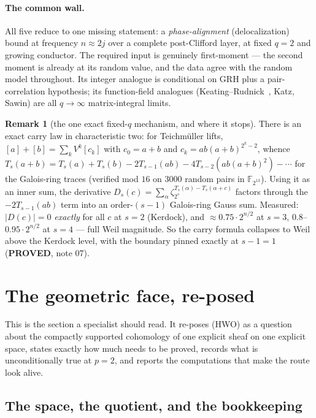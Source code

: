 \documentclass[10pt]{article}
\theoremstyle{plain}
\theoremstyle{definition}
\newtheorem{remark}[theorem]{Remark}
\newcommand{\F}{\mathbb F}
\newcommand{\proved}{\textcolor{proved}{\textsf{\textbf{\footnotesize PROVED}}}}
\begin{document}
\paragraph{The common wall.} All five reduce to one missing statement: a
\emph{phase-alignment} (delocalization) bound at frequency $n\approx2j$ over a
complete post-Clifford layer, at fixed $q=2$ and growing conductor. The
required input is genuinely first-moment --- the second moment is already at its
random value, and the data agree with the random model throughout. Its integer
analogue is conditional on GRH plus a pair-correlation hypothesis; its
function-field analogues (Keating--Rudnick~\cite{KR}, Katz, Sawin) are all
$q\to\infty$ matrix-integral limits.

\begin{remark}[the one exact fixed-$q$ mechanism, and where it stops]
There is an exact carry law in characteristic two: for Teichm\"uller lifts,
$[a]+[b]=\sum_kV^k[c_k]$ with $c_0=a+b$ and $c_k=ab(a+b)^{2^k-2}$, whence
$T_s(a+b)=T_s(a)+T_s(b)-2T_{s-1}(ab)-4T_{s-2}(ab(a+b)^2)-\cdots$ for the
Galois-ring traces (verified mod $16$ on $3000$ random pairs in
$\F_{2^{13}}$). Using it as an inner sum, the derivative
$D_s(c)=\sum_\alpha\zeta_{2^s}^{T_s(\alpha)-T_s(\alpha+c)}$ factors through the
$-2T_{s-1}(ab)$ term into an order-$(s-1)$ Galois-ring Gauss sum. Measured:
$|D(c)|=0$ \emph{exactly} for all $c$ at $s=2$ (Kerdock), and $\approx0.75\cdot2^{n/2}$
at $s=3$, $0.8$--$0.95\cdot2^{n/2}$ at $s=4$ --- full Weil magnitude. So the carry
formula collapses to Weil above the Kerdock level, with the boundary pinned
exactly at $s-1=1$ (\proved, note 07).
\end{remark}

\section{The geometric face, re-posed}\label{sec:geom}

This is the section a specialist should read. It re-poses (HWO) as a question
about the compactly supported cohomology of one explicit sheaf on one explicit
space, states exactly how much needs to be proved, records what is
unconditionally true at $p=2$, and reports the computations that make the route
look alive.

\subsection{The space, the quotient, and the bookkeeping}
\end{document}
